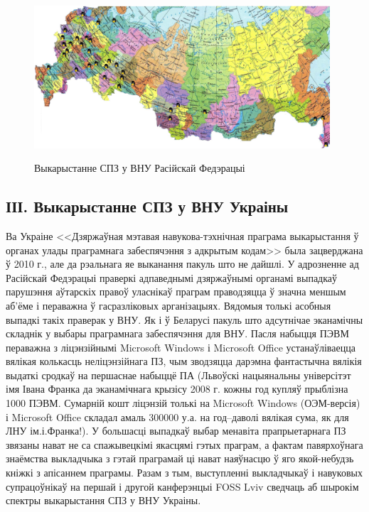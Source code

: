 \documentclass[10pt, a5paper]{article}
\begin{document}
\begin{figure}[htpb]
  \centering
  \includegraphics[width=11cm]{03_2012_russia2_with_tux}
  \label{fig:Zlobin2}
  \caption{Выкарыстанне СПЗ у ВНУ Расійскай Федэрацыі}
\end{figure}

\subsection*{ІІІ. Выкарыстанне СПЗ у ВНУ Украіны}

Ва Украіне <<Дзяржаўная мэтавая навукова-тэхнічная праграма выкарыстання ў
органах улады праграмнага забеспячэння з адкрытым кодам>> была зацверджана
ў 2010 г., але да рэальнага яе выканання пакуль што не дайшлі. У адрозненне ад
Расійскай Федэрацыі праверкі адпаведнымі дзяржаўнымі органамі выпадкаў
парушэння аўтарскіх правоў уласнікаў праграм праводзяцца ў значна меншым аб'ёме
і пераважна ў гасразліковых арганізацыях. Вядомыя толькі асобныя выпадкі такіх
праверак у ВНУ. Як і ў Беларусі пакуль што адсутнічае эканамічны складнік
у выбары праграмнага забеспячэння для ВНУ. Пасля набыцця ПЭВМ пераважна
з ліцэнзійнымі Microsoft Windows і Microsoft Office устанаўліваецца вялікая колькасць
неліцэнзійнага ПЗ, чым зводзяцца дарэмна фантастычна вялікія выдаткі сродкаў
на першаснае набыццё ПА (Львоўскі нацыянальны універсітэт імя Івана Франка
да эканамічнага крызісу 2008 г. кожны год купляў прыблізна 1000 ПЭВМ. Сумарній
кошт ліцэнзій толькі на Microsoft Windows (ОЭМ-версія) і Microsoft Office складал амаль 300000
у.а. на год--даволі вялікая сума, як для ЛНУ ім.і.Франка!). У большасці выпадкаў
выбар менавіта прапрыетарнага ПЗ звязаны нават не са спажывецкімі якасцямі
гэтых праграм, а фактам павярхоўнага знаёмства выкладчыка з гэтай праграмай
ці нават наяўнасцю ў яго якой-небудзь кніжкі з апісаннем праграмы. Разам з
тым, выступленні выкладчыкаў і навуковых супрацоўнікаў на першай і другой
канферэнцыі FOSS Lviv  \cite{Zlobin1, Zlobin2} сведчаць аб шырокім спектры выкарыстання СПЗ
у ВНУ Украіны.
\end{document}
